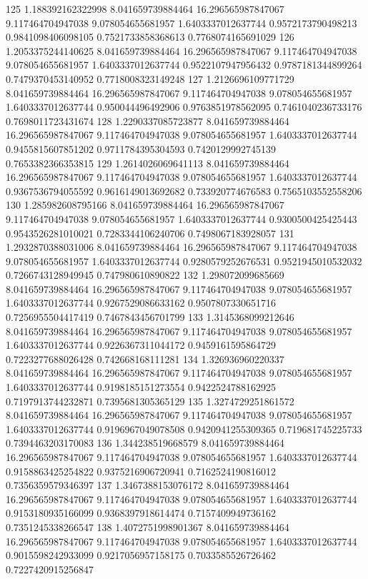 {125 1.188392162322998 8.041659739884464 16.296565987847067 9.117464704947038 9.078054655681957 1.6403337012637744 0.9572173790498213 0.9841098406098105 0.7521733858368613 0.7768074165691029
126 1.2053375244140625 8.041659739884464 16.296565987847067 9.117464704947038 9.078054655681957 1.6403337012637744 0.9522107947956432 0.9787181344899264 0.7479370453140952 0.7718008323149248
127 1.2126696109771729 8.041659739884464 16.296565987847067 9.117464704947038 9.078054655681957 1.6403337012637744 0.950044496492906 0.9763851978562095 0.7461040236733176 0.7698011723431674
128 1.2290337085723877 8.041659739884464 16.296565987847067 9.117464704947038 9.078054655681957 1.6403337012637744 0.9455815607851202 0.9711784395304593 0.7420129992745139 0.7653382366353815
129 1.2614026069641113 8.041659739884464 16.296565987847067 9.117464704947038 9.078054655681957 1.6403337012637744 0.9367536794055592 0.9616149013692682 0.733920774676583 0.7565103552558206
130 1.285982608795166 8.041659739884464 16.296565987847067 9.117464704947038 9.078054655681957 1.6403337012637744 0.9300500425425443 0.9543526281010021 0.7283344106240706 0.7498067183928057
131 1.2932870388031006 8.041659739884464 16.296565987847067 9.117464704947038 9.078054655681957 1.6403337012637744 0.9280579252676531 0.9521945010532032 0.7266743128949945 0.747980610890822
132 1.298072099685669 8.041659739884464 16.296565987847067 9.117464704947038 9.078054655681957 1.6403337012637744 0.9267529086633162 0.9507807330651716 0.7256955504417419 0.7467843456701799
133 1.3145368099212646 8.041659739884464 16.296565987847067 9.117464704947038 9.078054655681957 1.6403337012637744 0.9226367311044172 0.9459161595864729 0.7223277688026428 0.742668168111281
134 1.326936960220337 8.041659739884464 16.296565987847067 9.117464704947038 9.078054655681957 1.6403337012637744 0.9198185151273554 0.9422524788162925 0.7197913744232871 0.7395681305365129
135 1.3274729251861572 8.041659739884464 16.296565987847067 9.117464704947038 9.078054655681957 1.6403337012637744 0.9196967049078508 0.9420941255309365 0.719681745225733 0.7394463203170083
136 1.344238519668579 8.041659739884464 16.296565987847067 9.117464704947038 9.078054655681957 1.6403337012637744 0.9158863425254822 0.9375216906720941 0.7162524190816012 0.7356359579346397
137 1.3467388153076172 8.041659739884464 16.296565987847067 9.117464704947038 9.078054655681957 1.6403337012637744 0.9153180935166099 0.9368397918614474 0.7157409949736162 0.7351245338266547
138 1.4072751998901367 8.041659739884464 16.296565987847067 9.117464704947038 9.078054655681957 1.6403337012637744 0.9015598242933099 0.9217056957158175 0.7033585526726462 0.7227420915256847
}
